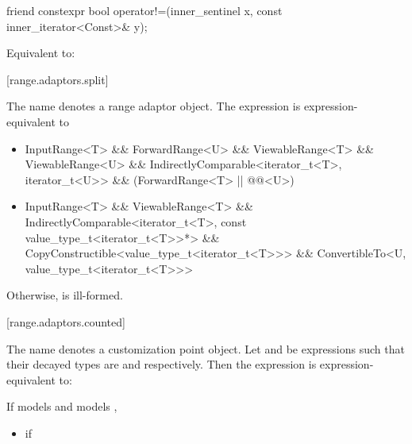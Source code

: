 {{%
\begin{itemdecl}
friend constexpr bool operator!=(inner_sentinel x, const inner_iterator<Const>& y);
\end{itemdecl}

\begin{itemdescr}
\pnum
\effects Equivalent to: 
\end{itemdescr}
} %

[range.adaptors.split]{}

\pnum
The name  denotes a range adaptor
object.
 The expression
  is expression-equivalent to 
{\color{oldclr}
\begin{itemize}
\item \begin{codeblock}
InputRange<T> && ForwardRange<U> &&
ViewableRange<T> && ViewableRange<U> &&
IndirectlyComparable<iterator_t<T>, iterator_t<U>> &&
(ForwardRange<T> || @@<U>)
\end{codeblock}

\item \begin{codeblock}
InputRange<T> && ViewableRange<T> &&
IndirectlyComparable<iterator_t<T>, const value_type_t<iterator_t<T>>*> &&
CopyConstructible<value_type_t<iterator_t<T>>> &&
ConvertibleTo<U, value_type_t<iterator_t<T>>>
\end{codeblock}
\end{itemize}
Otherwise,  is ill-formed.
} %


[range.adaptors.counted]{}

\pnum
The name  denotes a customization point
object.
Let  and  be expressions such that their decayed types are 
and  respectively. Then the expression  is
expression-equivalent to:

\begin{itemize}
{\color{newclr}
\item If  models  and  models
,
} %
  \begin{itemize}
  \item {} if   


\end{itemize}
\end{itemize}}
